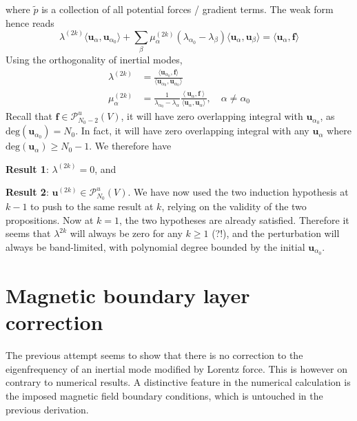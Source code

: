 %
where $\tilde{p}$ is a collection of all potential forces / gradient terms. The weak form hence reads
%
\begin{equation}
    \lambda^{(2k)} \langle \mathbf{u}_\alpha, \mathbf{u}_{\alpha_0} \rangle + \sum_\beta \mu_{\alpha}^{(2k)} (\lambda_{\alpha_0} - \lambda_\beta) \langle \mathbf{u}_\alpha, \mathbf{u}_{\beta} \rangle = \langle \mathbf{u}_{\alpha}, \mathbf{f} \rangle
\end{equation}
%
Using the orthogonality of inertial modes, 
%
\begin{align}
    \lambda^{(2k)} &= \frac{\langle \mathbf{u}_{\alpha_0}, \mathbf{f} \rangle}{\langle \mathbf{u}_{\alpha_0}, \mathbf{u}_{\alpha_0} \rangle} 
    \\ 
    \mu_{\alpha}^{(2k)} &= \frac{1}{\lambda_{\alpha_0} - \lambda_\alpha}\frac{\left\langle \mathbf{u}_{\alpha}, \mathbf{f} \right\rangle}{\langle \mathbf{u}_{\alpha}, \mathbf{u}_{\alpha} \rangle},\quad \alpha \neq \alpha_0
\end{align}
%
Recall that $\mathbf{f} \in \boldsymbol{\mathcal{P}}_{N_0-2}^u(V)$, it will have zero overlapping integral with $\mathbf{u}_{\alpha_0}$, as $\mathrm{deg}(\mathbf{u}_{\alpha_0}) = N_0$. In fact, it will have zero overlapping integral with any $\mathbf{u}_\alpha$ where $\mathrm{deg}(\mathbf{u}_{\alpha}) \geq N_0 - 1$. We therefore have

{\todoremark \textbf{Result 1}: $\lambda^{(2k)} = 0$}, and

{\todoremark \textbf{Result 2}: $\mathbf{u}^{(2k)} \in \boldsymbol{\mathcal{P}}_{N_0}^{u}(V)$}. We have now used the two induction hypothesis at $k-1$ to push to the same result at $k$, relying on the validity of the two propositions. Now at $k=1$, the two hypotheses are already satisfied. Therefore it seems that $\lambda^{2k}$ will always be zero for any $k \geq 1$ (?!), and the perturbation will always be band-limited, with polynomial degree bounded by the initial $\mathbf{u}_{\alpha_0}$.



\section{Magnetic boundary layer correction}

The previous attempt seems to show that there is no correction to the eigenfrequency of an inertial mode modified by Lorentz force. This is however on contrary to numerical results. A distinctive feature in the numerical calculation is the imposed magnetic field boundary conditions, which is untouched in the previous derivation.

